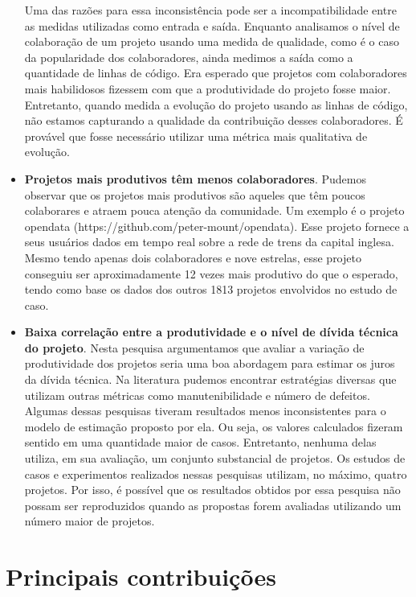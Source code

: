 \begin{itemize}
Uma das razões para essa inconsistência pode ser a incompatibilidade entre as medidas utilizadas como entrada e saída. Enquanto analisamos o nível de colaboração de um projeto usando uma medida de qualidade, como é o caso da popularidade dos colaboradores, ainda medimos a saída como a quantidade de linhas de código. Era esperado que projetos com colaboradores mais habilidosos fizessem com que a produtividade do projeto fosse maior. Entretanto, quando medida a evolução do projeto usando as linhas de código, não estamos capturando a qualidade da contribuição desses colaboradores. É provável que fosse necessário utilizar uma métrica mais qualitativa de evolução.
\item \textbf{Projetos mais produtivos têm menos colaboradores}. Pudemos observar que os projetos mais produtivos são aqueles que têm poucos colaborares e atraem pouca atenção da comunidade. Um exemplo é o projeto opendata (https://github.com/peter-mount/opendata). Esse projeto fornece a seus usuários dados em tempo real sobre a rede de trens da capital inglesa. Mesmo tendo apenas dois colaboradores e nove estrelas, esse projeto conseguiu ser aproximadamente 12 vezes mais produtivo do que o esperado, tendo como base os dados dos outros 1813 projetos envolvidos no estudo de caso.
\item \textbf{Baixa correlação entre a produtividade e o nível de dívida técnica do projeto}. Nesta pesquisa argumentamos que avaliar a variação de produtividade dos projetos seria uma boa abordagem para estimar os juros da dívida técnica. Na literatura pudemos encontrar  estratégias diversas que utilizam outras métricas como manutenibilidade e número de defeitos. Algumas dessas pesquisas tiveram resultados menos inconsistentes para o modelo de estimação proposto por ela. Ou seja, os valores calculados fizeram sentido em uma quantidade maior de casos. Entretanto, nenhuma delas utiliza, em sua avaliação, um conjunto substancial de projetos.  Os estudos de casos e experimentos realizados nessas pesquisas utilizam, no máximo, quatro projetos. Por isso, é possível que os resultados obtidos por essa pesquisa não possam ser reproduzidos quando as propostas forem avaliadas utilizando um número maior de projetos.

\end{itemize}





\section{Principais contribuições}

